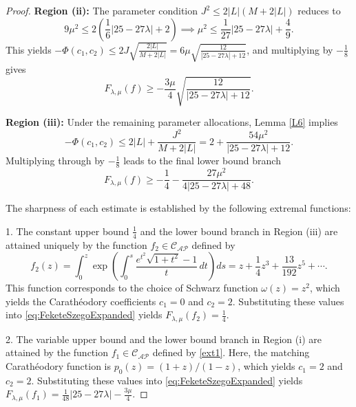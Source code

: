 \documentclass[10pt,a4paper]{amsart}
\numberwithin{equation}{section}
\begin{document}
\begin{proof}
\medskip
\noindent\textbf{Region (ii):} The parameter condition $J^2 \le 2|L|(M+2|L|)$ reduces to
\[
9\mu^2 \le 2\left(\frac{1}{6}|25-27\lambda| + 2\right) \implies \mu^2 \le \frac{1}{27} |25 - 27\lambda| + \frac{4}{9}.
\]
This yields $-\Phi(c_1,c_2) \le 2J \sqrt{\frac{2|L|}{M+2|L|}} = 6\mu \sqrt{\frac{12}{|25-27\lambda|+12}}$, and multiplying by $-\frac{1}{8}$ gives
\[
F_{\lambda,\mu}(f) \ge -\frac{3\mu}{4} \sqrt{ \frac{12}{|25 - 27\lambda| + 12} }.
\]

\medskip
\noindent\textbf{Region (iii):} Under the remaining parameter allocations, Lemma \ref{L6} implies
\[
-\Phi(c_1,c_2) \le 2|L| + \frac{J^2}{M+2|L|} = 2 + \frac{54\mu^2}{|25-27\lambda|+12}.
\]
Multiplying through by $-\frac{1}{8}$ leads to the final lower bound branch
\[
F_{\lambda,\mu}(f) \ge -\frac{1}{4} - \frac{27\mu^2}{4 |25 - 27\lambda| + 48}.
\]

The sharpness of each estimate is established by the following extremal functions:

1. The constant upper bound $\frac{1}{4}$ and the lower bound branch in Region (iii) are attained uniquely by the function $f_2 \in \mathcal{C}_{\mathcal{AP}}$ defined by
\begin{equation}\label{ext2_dup}
f_2(z) = \int_0^z \exp\left( \int_0^s \frac{e^{t^2}\sqrt{1+t^2}-1}{t}\,dt \right) ds = z + \frac{1}{4}z^3 + \frac{13}{192}z^5 + \cdots.
\end{equation}
This function corresponds to the choice of Schwarz function $\omega(z) = z^2$, which yields the Carath\'{e}odory coefficients $c_1=0$ and $c_2=2$. Substituting these values into \eqref{eq:FeketeSzegoExpanded} yields $F_{\lambda,\mu}(f_2) = \frac{1}{4}$.

2. The variable upper bound and the lower bound branch in Region (i) are attained by the function $f_1 \in \mathcal{C}_{\mathcal{AP}}$ defined by \eqref{ext1}. Here, the matching Carath\'{e}odory function is $p_0(z) = (1+z)/(1-z)$, which yields $c_1=2$ and $c_2=2$. Substituting these values into \eqref{eq:FeketeSzegoExpanded} yields $F_{\lambda,\mu}(f_1) = \frac{1}{48}|25-27\lambda| - \frac{3\mu}{4}$.


\end{proof}
\end{document}
